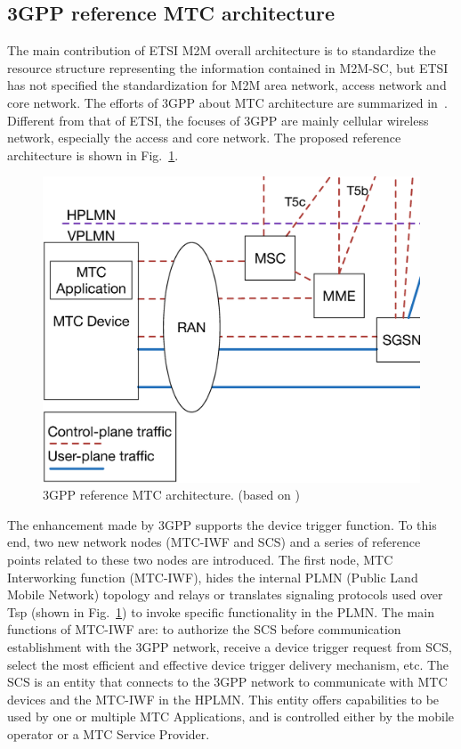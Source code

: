 \subsection{3GPP reference MTC architecture}
The main contribution of ETSI M2M overall architecture is to standardize the resource structure representing the information contained in M2M-SC, but ETSI has not specified the standardization for M2M area network, access network and core network.
The efforts of 3GPP about MTC architecture are summarized in~\cite{3GPP/TS/23682}\cite{3GPP/TR/23888V11}. Different from that of ETSI, the focuses of 3GPP are mainly cellular wireless network, especially the access and core network. The proposed reference architecture is shown in Fig.~\ref{fig:3gpp-ref-arch}.
\begin{figure}[!t]
	\centering
	\includegraphics[width=0.9\linewidth]{Chapter2/Figures/3GPP-ref-architecture-V2}
	\caption{3GPP reference MTC architecture. (based on \cite{3GPP/TR/23888V11} )}
	\label{fig:3gpp-ref-arch}
\end{figure}
The enhancement made by 3GPP supports the device trigger function. To this end, two new network nodes (MTC-IWF and SCS) and a series of reference points related to these two nodes are introduced. The first node, MTC Interworking function (MTC-IWF), hides the internal PLMN (Public Land Mobile Network) topology and relays or translates signaling protocols used over Tsp (shown in Fig.~\ref{fig:3gpp-ref-arch}) to invoke specific functionality in the PLMN. The main functions of MTC-IWF are: to authorize the SCS before communication establishment with the 3GPP network, receive a device trigger request from SCS, select the most efficient and effective device trigger delivery mechanism, etc.
The SCS is an entity that connects to the 3GPP network to communicate with MTC devices and the MTC-IWF in the HPLMN. This entity offers capabilities to be used by one or multiple MTC Applications, and is controlled either by the mobile operator or a MTC Service Provider. 

